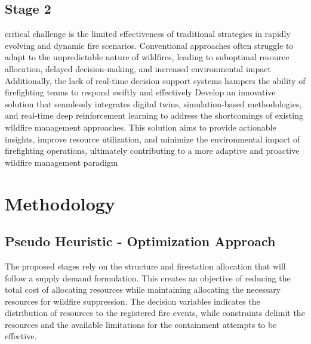 \documentclass[lettersize,journal]{IEEEtran}
\begin{document}
\subsection{Stage 2}

critical challenge is the limited effectiveness of traditional strategies in rapidly evolving and dynamic fire scenarios. Conventional approaches often struggle to adapt to the unpredictable nature of wildfires, leading to suboptimal resource allocation, delayed decision-making, and increased environmental impact
Additionally, the lack of real-time decision support systems hampers the ability of firefighting teams to respond swiftly and effectively
Develop an innovative solution that seamlessly integrates digital twins, simulation-based methodologies, and real-time deep reinforcement learning to address the shortcomings of existing wildfire management approaches. This solution aims to provide actionable insights, improve resource utilization, and minimize the environmental impact of firefighting operations, ultimately contributing to a more adaptive and proactive wildfire management paradigm








\section{Methodology}\label{Methodology}


\subsection*{Pseudo Heuristic - Optimization Approach}\label{Pseudo Heuristic - Optimization Approach}

The proposed stages rely on the structure and firestation allocation that will follow a supply demand formulation. This creates an objective of reducing the total cost of allocating resources while maintaining allocating the necessary resources for wildfire suppression. The decision variables indicates the distribution of resources to the registered fire events, while constraints delimit the resources and the available limitations for the containment attempts to be effective.\\
\end{document}
